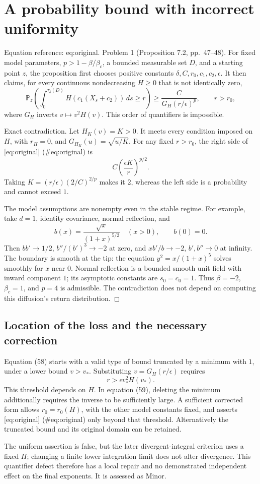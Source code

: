 \documentclass[10pt]{article}
\begin{document}
\section*{A probability bound with incorrect uniformity}
Equation reference: eq:original. Problem 1 (Proposition 7.2, pp. 47–48).  For fixed model parameters, \(p>1-\beta/\beta_c\), a bounded measurable set \(D\), and a starting point \(z\), the proposition first chooses positive constants \(\delta,C,r_0,c_1,c_2,\epsilon\). It then claims, for every continuous nondecreasing \(H\ge0\) that is not identically zero, \[
 \mathbb P_z\!\left(\int_0^{\tau_\delta(D)}
 H(c_1(X_s+c_2))\,ds\ge r\right)
 \ge \frac{C}{G_H(r/\epsilon)^p},\qquad r>r_0,\] where \(G_H\) inverts \(v\mapsto v^2H(v)\). This order of quantifiers is impossible.\par
Exact contradiction. Let \(H_K(v)=K>0\). It meets every condition imposed on \(H\), with \(r_H=0\), and \(G_{H_K}(u)=\sqrt{u/K}\). For any fixed \(r>r_0\), the right side of [eq:original] (\#eq:original) is \[C\left(\frac{\epsilon K}{r}\right)^{p/2}.\] Taking \(K=(r/\epsilon)(2/C)^{2/p}\) makes it \(2\), whereas the left side is a probability and cannot exceed \(1\).\par
The model assumptions are nonempty even in the stable regime. For example, take \(d=1\), identity covariance, normal reflection, and \[b(x)=\frac{\sqrt{x}}{(1+x)^{5/2}}\quad(x>0),\qquad b(0)=0.\] Then \(bb'\to1/2\), \(b''/(b')^3\to-2\) at zero, and \(xb'/b\to-2\), \(b',b''\to0\) at infinity. The boundary is smooth at the tip: the equation \(y^2=x/(1+x)^5\) solves smoothly for \(x\) near \(0\). Normal reflection is a bounded smooth unit field with inward component \(1\); its asymptotic constants are \(s_0=c_0=1\). Thus \(\beta=-2\), \(\beta_c=1\), and \(p=4\) is admissible. The contradiction does not depend on computing this diffusion’s return distribution. ◻\par
\subsection*{Location of the loss and the necessary correction}
Equation (58) starts with a valid type of bound truncated by a minimum with \(1\), under a lower bound \(v>v_*\). Substituting \(v=G_H(r/\epsilon)\) requires \[r>\epsilon v_*^2 H(v_*).\] This threshold depends on \(H\). In equation (59), deleting the minimum additionally requires the inverse to be sufficiently large. A sufficient corrected form allows \(r_0=r_0(H)\), with the other model constants fixed, and asserts [eq:original] (\#eq:original) only beyond that threshold. Alternatively the truncated bound and its original domain can be retained.\par
The uniform assertion is false, but the later divergent-integral criterion uses a fixed \(H\); changing a finite lower integration limit does not alter divergence. This quantifier defect therefore has a local repair and no demonstrated independent effect on the final exponents. It is assessed as Minor.\par
\end{document}
